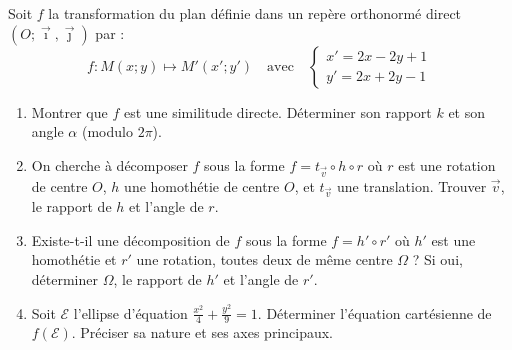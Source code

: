 \documentclass[11pt]{article}
\begin{document}
\begin{exercice}
Soit $f$ la transformation du plan définie dans un repère orthonormé direct $(O;\vec{\imath},\vec{\jmath})$ par :
\[
f : M(x;y) \mapsto M'(x';y') \quad \text{avec} \quad 
\begin{cases}
x' = 2x - 2y + 1 \\
y' = 2x + 2y - 1
\end{cases}
\]
\begin{enumerate}
    \item Montrer que $f$ est une similitude directe. Déterminer son rapport $k$ et son angle $\alpha$ (modulo $2\pi$).
    \item On cherche à décomposer $f$ sous la forme $f = t_{\vec{v}} \circ h \circ r$ où $r$ est une rotation de centre $O$, $h$ une homothétie de centre $O$, et $t_{\vec{v}}$ une translation.
    Trouver $\vec{v}$, le rapport de $h$ et l'angle de $r$.
    \item Existe-t-il une décomposition de $f$ sous la forme $f = h' \circ r'$ où $h'$ est une homothétie et $r'$ une rotation, toutes deux de même centre $\Omega$ ? Si oui, déterminer $\Omega$, le rapport de $h'$ et l'angle de $r'$.
    \item Soit $\mathcal{E}$ l'ellipse d'équation $\frac{x^2}{4} + \frac{y^2}{9} = 1$. Déterminer l'équation cartésienne de $f(\mathcal{E})$. Préciser sa nature et ses axes principaux.
\end{enumerate}
\end{exercice}
\end{document}
